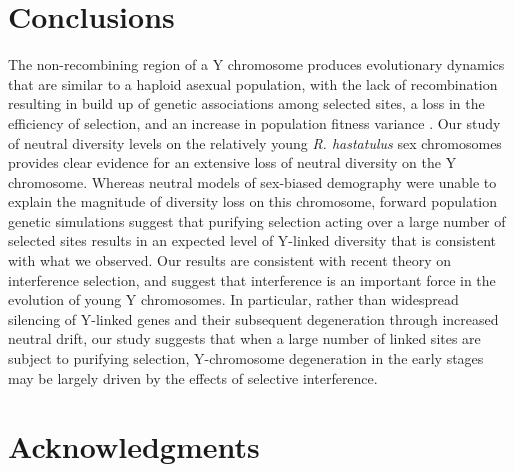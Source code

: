 \documentclass[9pt,twocolumn,twoside]{gsajnl}
\begin{document}
\section*{Conclusions}
The non-recombining region of a Y chromosome produces evolutionary dynamics that are similar to a haploid asexual population, with the lack of recombination resulting in build up of genetic associations among selected sites, a loss in the efficiency of selection, and an increase in population fitness variance \citep{fisher1930genetical, muller1964relation, hill1966HReffect, mcvean2000,KaiserCharlesworth,good2014genetic}. Our study of neutral diversity levels on the relatively young \textit{R. hastatulus} sex chromosomes provides clear evidence for an extensive loss of neutral diversity on the Y chromosome. Whereas neutral models of sex-biased demography were unable to explain the magnitude of diversity loss on this chromosome, forward population genetic simulations suggest that purifying selection acting over a large number of selected sites results in an expected level of Y-linked diversity that is consistent with what we observed. Our results are consistent with recent theory on interference selection, and suggest that interference is an important force in the evolution of  young Y chromosomes. In particular, rather than widespread silencing of Y-linked genes and their subsequent degeneration through increased neutral drift, our study suggests that when a large number of linked sites are subject to purifying selection, Y-chromosome degeneration in the early stages may be largely driven by the effects of selective interference.
\section*{Acknowledgments}


\end{document}

